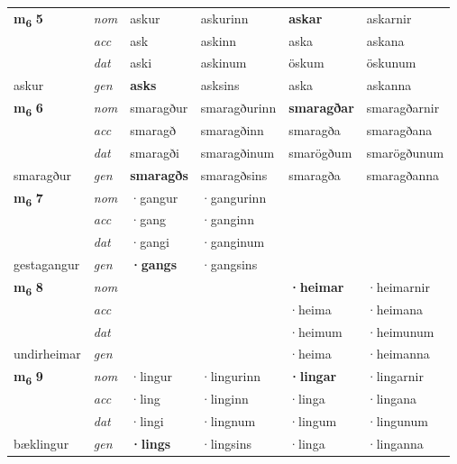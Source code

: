 \begin{longtable}[l]{X>{\footnotesize\itshape}XXXXX}
\multirow{3}{*}{{{\textbf{m{\textsubscript{6}}} \Large{\textbf{5}}}}}  
 & nom & askur & askurinn    & \textbf{askar} & askarnir  \\*
 & acc & ask  & askinn   & aska  & askana \\*
 & dat & aski & askinum   & öskum & öskunum \\*
 {\footnotesize{askur}} &  gen & \textbf{asks}  & asksins  & aska & askanna \\
\cmidrule{1-6}


\multirow{3}{*}{{{\textbf{m{\textsubscript{6}}} \Large{\textbf{6}}}}}  
 & nom & smaragður & smaragðurinn    & \textbf{smaragðar} & smaragðarnir  \\*
 & acc & smaragð  & smaragðinn   & smaragða  & smaragðana \\*
 & dat & smaragði & smaragðinum   & smarögðum & smarögðunum \\*
 {\footnotesize{smaragður}} &  gen & \textbf{smaragðs}  & smaragðsins  & smaragða & smaragðanna \\
\cmidrule{1-6}


\multirow{3}{*}{{{\textbf{m{\textsubscript{6}}} \Large{\textbf{7}}}}}  
 & nom & ·gangur & ·gangurinn    & \textbf{} &   \\*
 & acc & ·gang  & ·ganginn   &   &  \\*
 & dat & ·gangi & ·ganginum   &  &  \\*
 {\footnotesize{gestagangur}} &  gen & \textbf{·gangs}  & ·gangsins  &  &  \\
\cmidrule{1-6}


\multirow{3}{*}{{{\textbf{m{\textsubscript{6}}} \Large{\textbf{8}}}}}  
 & nom &  &     & \textbf{·heimar} & ·heimarnir  \\*
 & acc &   &    & ·heima  & ·heimana \\*
 & dat &  &    & ·heimum & ·heimunum \\*
 {\footnotesize{undirheimar}} &  gen & \textbf{}  &   & ·heima & ·heimanna \\
\cmidrule{1-6}


\multirow{3}{*}{{{\textbf{m{\textsubscript{6}}} \Large{\textbf{9}}}}}  
 & nom & ·lingur & ·lingurinn    & \textbf{·lingar} & ·lingarnir  \\*
 & acc & ·ling  & ·linginn   & ·linga  & ·lingana \\*
 & dat & ·lingi & ·lingnum   & ·lingum & ·lingunum \\*
 {\footnotesize{bæklingur}} &  gen & \textbf{·lings}  & ·lingsins  & ·linga & ·linganna \\
\cmidrule{1-6}



\end{longtable}
